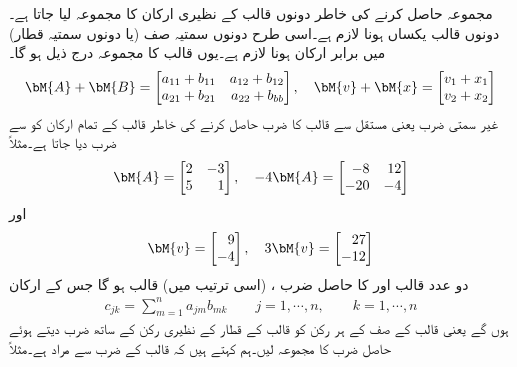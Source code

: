 مجموعہ حاصل کرنے کی خاطر دونوں قالب کے نظیری ارکان کا مجموعہ لیا جاتا ہے۔دونوں قالب یکساں  ہونا لازم ہے۔اسی طرح دونوں سمتیہ صف (یا دونوں سمتیہ قطار) میں برابر ارکان ہونا لازم ہے۔یوں  قالب کا مجموعہ درج ذیل ہو گا۔
\begin{align}
\bM{A}+\bM{B}=
\begin{bmatrix*}[r]
a_{11}+b_{11} & a_{12}+b_{12}\\
a_{21}+b_{21}& a_{22}+b_{bb}
\end{bmatrix*}, \quad \bM{v}+\bM{x}=
\begin{bmatrix*}[r]
v_1+x_1\\
v_2+x_2
\end{bmatrix*}
\end{align} 
 غیر سمتی ضرب یعنی مستقل   سے قالب کا ضرب حاصل کرنے کی خاطر قالب کے تمام ارکان کو  سے ضرب دیا جاتا ہے۔مثلاً 
\begin{align*}
\bM{A}=
\begin{bmatrix*}[r]
2& -3\\
5&1
\end{bmatrix*}, \quad 
-4\bM{A}=
\begin{bmatrix*}[r]
-8&12\\
-20&-4
\end{bmatrix*}
\end{align*}
اور
\begin{align*}
\bM{v}=
\begin{bmatrix*}[r]
9\\
-4
\end{bmatrix*}, \quad 
3\bM{v}=
\begin{bmatrix*}[r]
27\\
-12
\end{bmatrix*}
\end{align*}
دو عدد  قالب  اور   کا حاصل ضرب ، (اسی ترتیب میں)  قالب  ہو گا جس کے ارکان 
\begin{align}
c_{jk}=\sum_{m=1}^{n} a_{jm} b_{mk} \quad \quad j=1, \cdots, n, \quad\quad k=1,\cdots,n
\end{align}
ہوں گے یعنی  قالب کے  صف کے ہر رکن کو  قالب کے  قطار کے نظیری رکن کے ساتھ ضرب دیتے ہوئے  حاصل ضرب  کا مجموعہ لیں۔ہم کہتے ہیں کہ قالب کے ضرب سے مراد   ہے۔مثلاً
